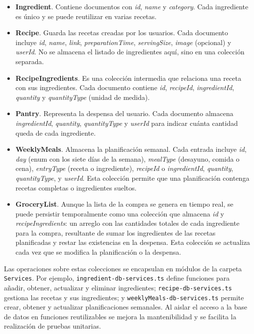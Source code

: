 \documentclass[twoside, openright, 11pt]{report}
\begin{document}
\begin{itemize}
  \item \textbf{Ingredient}. Contiene documentos con \emph{id}, \emph{name} y \emph{category}. Cada ingrediente es único y se puede reutilizar en varias recetas.
  \item \textbf{Recipe}. Guarda las recetas creadas por los usuarios. Cada documento incluye \emph{id}, \emph{name}, \emph{link}, \emph{preparationTime}, \emph{servingSize}, \emph{image} (opcional) y \emph{userId}. No se almacena el listado de ingredientes aquí, sino en una colección separada.
  \item \textbf{RecipeIngredients}. Es una colección intermedia que relaciona una receta con sus ingredientes. Cada documento contiene \emph{id}, \emph{recipeId}, \emph{ingredientId}, \emph{quantity} y \emph{quantityType} (unidad de medida).
  \item \textbf{Pantry}. Representa la despensa del usuario. Cada documento almacena \emph{ingredientId}, \emph{quantity}, \emph{quantityType} y \emph{userId} para indicar cuánta cantidad queda de cada ingrediente.
  \item \textbf{WeeklyMeals}. Almacena la planificación semanal. Cada entrada incluye \emph{id}, \emph{day} (enum con los siete días de la semana), \emph{mealType} (desayuno, comida o cena), \emph{entryType} (receta o ingrediente), \emph{recipeId} o \emph{ingredientId}, \emph{quantity}, \emph{quantityType}, y \emph{userId}. Esta colección permite que una planificación contenga recetas completas o ingredientes sueltos.
  \item \textbf{GroceryList}. Aunque la lista de la compra se genera en tiempo real, se puede persistir temporalmente como una colección que almacena \emph{id} y \emph{recipeIngredients}: un arreglo con las cantidades totales de cada ingrediente para la compra, resultante de sumar los ingredientes de las recetas planificadas y restar las existencias en la despensa. Esta colección se actualiza cada vez que se modifica la planificación o la despensa.
\end{itemize}

Las operaciones sobre estas colecciones se encapsulan en módulos de la carpeta \texttt{Services}. Por ejemplo, \texttt{ingredient-db-services.ts} define funciones para añadir, obtener, actualizar y eliminar ingredientes; \texttt{recipe-db-services.ts} gestiona las recetas y sus ingredientes; y \texttt{weeklyMeals-db-services.ts} permite crear, obtener y actualizar planificaciones semanales. Al aislar el acceso a la base de datos en funciones reutilizables se mejora la mantenibilidad y se facilita la realización de pruebas unitarias.
\end{document}

